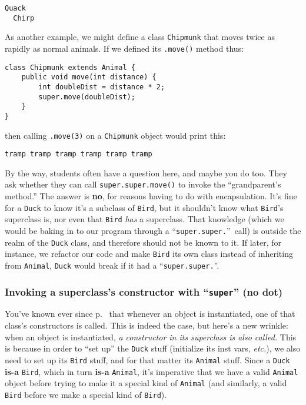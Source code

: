 \vspace{-.15in}
\begin{Verbatim}[fontsize=\small,samepage=true,frame=none]
  Quack
  Chirp
\end{Verbatim}
\vspace{-.15in}

As another example, we might define a class \texttt{Chipmunk} that moves twice
as rapidly as normal animals. If we defined its \texttt{.move()} method thus:

\begin{Verbatim}[fontsize=\footnotesize,samepage=true,frame=single]
class Chipmunk extends Animal {
    public void move(int distance) {
        int doubleDist = distance * 2;
        super.move(doubleDist);
    }
}
\end{Verbatim}

then calling \texttt{.move(3)} on a \texttt{Chipmunk} object would print this:

\begin{Verbatim}[fontsize=\small,samepage=true,frame=none]
  tramp tramp tramp tramp tramp tramp
\end{Verbatim}


By the way, students often have a question here, and maybe you do too. They ask
whether they can call \texttt{super.super.move()} to invoke the ``grandparent's
method.'' The answer is \textbf{no}, for reasons having to do with
encapsulation. It's fine for a \texttt{Duck} to know it's a subclass of
\texttt{Bird}, but it shouldn't know what \texttt{Bird}'s superclass is, nor
even that \texttt{Bird} \textit{has} a superclass. That knowledge (which we
would be baking in to our program through a ``\texttt{super.super.}''\ call) is
outside the realm of the \texttt{Duck} class, and therefore should not be known
to it. If later, for instance, we refactor our code and make \texttt{Bird} its
own class instead of inheriting from \texttt{Animal}, \texttt{Duck} would break
if it had a ``\texttt{super.super.}''.

\subsubsection{Invoking a superclass's constructor with ``\texttt{super}'' (no
dot)}

You've known ever since p.~\pageref{page:instantiateConstructor} that whenever
an object is instantiated, one of that class's constructors is called. This is
indeed the case, but here's a new wrinkle: when an object is instantiated,
\textit{a constructor in its superclass is also called.} This is because in
order to ``set up'' the \texttt{Duck} stuff (initialize its inst vars,
\textit{etc.}), we also need to set up its \texttt{Bird} stuff, and for that
matter its \texttt{Animal} stuff. Since a \texttt{Duck} \textbf{is-a}
\texttt{Bird}, which in turn \textbf{is-a} \texttt{Animal}, it's imperative
that we have a valid \texttt{Animal} object before trying to make it a
special kind of \texttt{Animal} (and similarly, a valid \texttt{Bird} before
we make a special kind of \texttt{Bird}).

